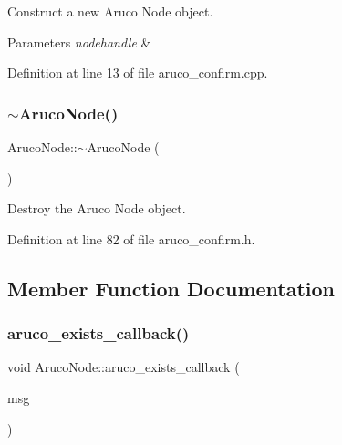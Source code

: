 Construct a new Aruco Node object. 


\begin{DoxyParams}{Parameters}
{\em nodehandle} & \\
\hline
\end{DoxyParams}


Definition at line 13 of file aruco\+\_\+confirm.\+cpp.

\mbox{\label{class_aruco_node_a134694163a28530a800198e2c039eb25}} 
\subsubsection{\texorpdfstring{$\sim$\+Aruco\+Node()}{~ArucoNode()}}
{\footnotesize\ttfamily Aruco\+Node\+::$\sim$\+Aruco\+Node (\begin{DoxyParamCaption}{ }\end{DoxyParamCaption})\hspace{0.3cm}{\ttfamily [inline]}}



Destroy the Aruco Node object. 



Definition at line 82 of file aruco\+\_\+confirm.\+h.



\subsection{Member Function Documentation}
\mbox{\label{class_aruco_node_a38f5977cae0f0cc0d30449db22b2e9d6}} 
\subsubsection{\texorpdfstring{aruco\+\_\+exists\+\_\+callback()}{aruco\_exists\_callback()}}
{\footnotesize\ttfamily void Aruco\+Node\+::aruco\+\_\+exists\+\_\+callback (\begin{DoxyParamCaption}\item[{const fiducial\+\_\+msgs\+::\+Fiducial\+Transform\+Array\+::\+Const\+Ptr \&}]{msg }\end{DoxyParamCaption})}




